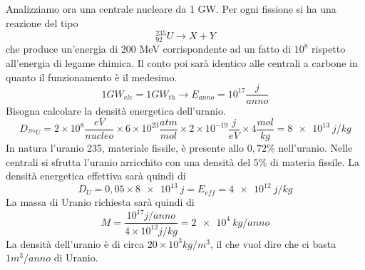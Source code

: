 Analizziamo ora una centrale nucleare da 1 GW.
Per ogni fissione si ha una reazione del tipo
\begin{equation}
_{92}^{235}U\longrightarrow X+Y
\end{equation}
che produce un'energia di 200 MeV corrispondente ad un fatto di $10^8$ rispetto all'energia di legame chimica.
Il conto poi sarà identico alle centrali a carbone in quanto il funzionamento è il medesimo.
\begin{equation}
1GW_{ele}=1GW_{th}\longrightarrow E_{anno}=10^{17}\frac{j}{anno}
\end{equation}
Bisogna calcolare la densità energetica dell'uranio.
\begin{equation}
D_{^{235}U}=2\times10^8\frac{eV}{nucleo}\times 6\times10^{23}\frac{atm}{mol}\times2\times10^{-19}\frac{j}{eV}\times4\frac{mol}{kg}=\SI{8e13}{j/kg}
\end{equation}
In natura l'uranio 235, materiale fissile, è presente allo $0,72\%$ nell'uranio. 
Nelle centrali si sfrutta l'uranio arricchito con una densità del $5\%$ di materia fissile.
La densità energetica effettiva sarà quindi di 
\begin{equation}
D_U=0,05\times\SI{8e13}{j}=E_{eff}=\SI{4e12}{j/kg}
\end{equation}
La massa di Uranio richiesta sarà quindi di 
\begin{equation}
M=\frac{10^{17}j/anno}{4\times10^{12}j/kg}=\SI{2e4}{kg/anno}
\end{equation}
La densità dell'uranio è di circa $20\times10^3 kg/m^3$, il che vuol dire che ci basta $1 m^3/anno$ di Uranio.



